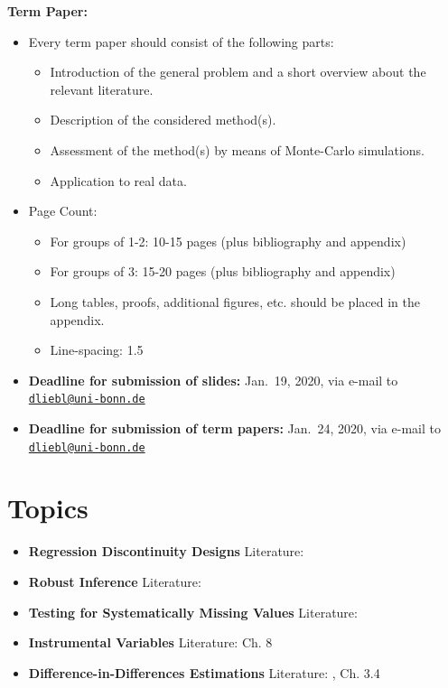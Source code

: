 \documentclass[]{book}
\providecommand{\tightlist}{%
  \setlength{\itemsep}{0pt}\setlength{\parskip}{0pt}}
\theoremstyle{definition}
\theoremstyle{definition}
\theoremstyle{definition}
\theoremstyle{remark}
\begin{document}
\textbf{Term Paper:}

\begin{itemize}
\tightlist
\item
  Every term paper should consist of the following parts:

  \begin{itemize}
  \tightlist
  \item
    Introduction of the general problem and a short overview about the relevant literature.
  \item
    Description of the considered method(s).
  \item
    Assessment of the method(s) by means of Monte-Carlo simulations.
  \item
    Application to real data.
  \end{itemize}
\item
  Page Count:

  \begin{itemize}
  \tightlist
  \item
    For groups of 1-2: 10-15 pages (plus bibliography and appendix)
  \item
    For groups of 3: 15-20 pages (plus bibliography and appendix)
  \item
    Long tables, proofs, additional figures, etc. should be placed in the appendix.
  \item
    Line-spacing: 1.5
  \end{itemize}
\item
  \textbf{Deadline for submission of slides:} Jan.~19, 2020, via e-mail to \href{mailto:dliebl@uni-bonn.de}{\nolinkurl{dliebl@uni-bonn.de}}\\
\item
  \textbf{Deadline for submission of term papers:} Jan.~24, 2020, via e-mail to \href{mailto:dliebl@uni-bonn.de}{\nolinkurl{dliebl@uni-bonn.de}}
\end{itemize}

\hypertarget{topics}{%
\chapter*{Topics}\label{topics}}

\begin{itemize}
\item
  \textbf{Regression Discontinuity Designs}
  Literature: \citet{IL2008}
\item
  \textbf{Robust Inference}
  Literature: \citet{RobInf2011}
\item
  \textbf{Testing for Systematically Missing Values}
  Literature: \citet{L1988}
\item
  \textbf{Instrumental Variables}
  Literature: \citet{DMcK2004} Ch. 8
\item
  \textbf{Difference-in-Differences Estimations}
  Literature: \citet{DID_2004}, \citet{cerulli2015} Ch. 3.4
\end{itemize}
\end{document}
